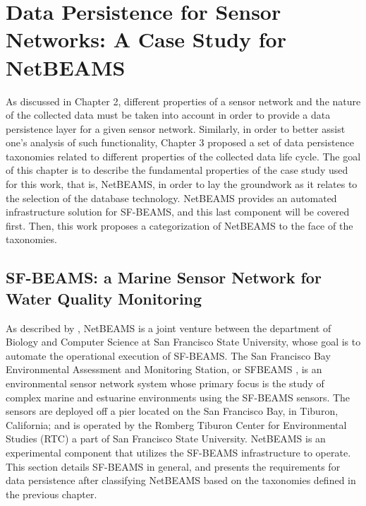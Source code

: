 

\chapter{Data Persistence for Sensor Networks: A Case Study for NetBEAMS}
\label{chap:netbeams-overview}

As discussed in Chapter 2, different properties of a sensor network and the
nature of the collected data must be taken into account in order to provide a
data persistence layer for a given sensor network. Similarly, in order to
better assist one's analysis of such functionality, Chapter 3 proposed a set of
data persistence taxonomies related to different properties of the collected
data life cycle. The goal of this chapter is to describe the fundamental properties 
of the case study used for this work, that is, NetBEAMS, in order to lay the 
groundwork as it relates to the selection of the database technology. NetBEAMS 
provides an automated infrastructure solution for SF-BEAMS, and this last component 
will be covered first. Then, this work proposes a categorization of NetBEAMS to 
the face of the taxonomies.

\section{SF-BEAMS: a Marine Sensor Network for Water Quality Monitoring}

As described by \cite{netbeams2009}, NetBEAMS is a joint venture between the
department of Biology and Computer Science at San Francisco State University,
whose goal is to automate the operational execution of SF-BEAMS. The San Francisco
Bay Environmental Assessment and Monitoring Station, or SFBEAMS \cite{sfbeams2006}, 
is an environmental sensor network system whose primary focus is the study of complex 
marine and estuarine environments using the SF-BEAMS sensors. The sensors are deployed off a
pier located on the San Francisco Bay, in Tiburon, California; and is operated by 
the Romberg Tiburon Center for Environmental Studies (RTC) a part of San Francisco
State University. NetBEAMS is an experimental component that utilizes the SF-BEAMS 
infrastructure to operate. This section details SF-BEAMS in general, and
presents the requirements for data persistence after classifying NetBEAMS based
on the taxonomies defined in the previous chapter.


